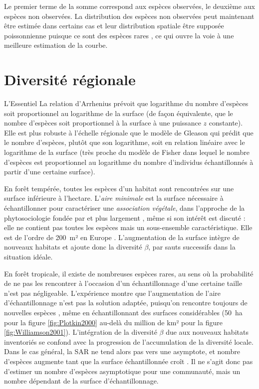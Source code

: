 \documentclass[
  11pt,
  french,
  a4paper,
  extrafontsizes,onecolumn,openright
  ]{memoir}
\newenvironment{Summary}
  {\begin{bclogo}[logo=\bctrombone, noborder=true, couleur=lightgray!50]{L'Essentiel}\parindent0pt}
  {\end{bclogo}}
\newlength{\rf}
\begin{document}
Le premier terme de la somme correspond aux espèces observées, le deuxième aux espèces non observées.
La distribution des espèces non observées peut maintenant être estimée dans certains cas \autocite{Chao2014c} et leur distribution spatiale être supposée poissonnienne puisque ce sont des espèces rares \autocite{Picard2004}, ce qui ouvre la voie à une meilleure estimation de la courbe.

\hypertarget{diversituxe9-ruxe9gionale}{%
\chapter{Diversité régionale}\label{diversituxe9-ruxe9gionale}}

\scriptsize

\begin{Summary}
La relation d'Arrhenius prévoit que logarithme du nombre d'espèces soit
proportionnel au logarithme de la surface (de façon équivalente, que le
nombre d'espèces soit proportionnel à la surface à une puissance \(z\)
constante). Elle est plus robuste à l'échelle régionale que le modèle de
Gleason qui prédit que le nombre d'espèces, plutôt que son logarithme,
soit en relation linéaire avec le logarithme de la surface (très proche
du modèle de Fisher dans lequel le nombre d'espèces est proportionnel au
logarithme du nombre d'individus échantillonnés à partir d'une certaine
surface).
\end{Summary}

\normalsize

En forêt tempérée, toutes les espèces d'un habitat sont rencontrées sur une surface inférieure à l'hectare.
L'\emph{aire minimale} est la surface nécessaire à échantillonner pour caractériser une \emph{association végétale}, dans l'approche de la phytosociologie fondée par \textcite{Braun-Blanquet1928} et plus largement \autocite{Greig-Smith1983}, même si son intérêt est discuté \autocite{McGuinness1984}: elle ne contient pas toutes les espèces mais un sous-ensemble caractéristique.
Elle est de l'ordre de 200~m² en Europe \autocite{Chytry2003}.
L'augmentation de la surface intègre de nouveaux habitats et ajoute donc la diversité \(\beta\), par sauts successifs dans la situation idéale.

En forêt tropicale, il existe de nombreuses espèces rares, au sens où la probabilité de ne pas les rencontrer à l'occasion d'un échantillonnage d'une certaine taille n'est pas négligeable.
L'expérience montre que l'augmentation de l'aire d'échantillonnage n'est pas la solution adaptée, puisqu'on rencontre toujours de nouvelles espèces \autocite{Gotelli2001}, même en échantillonnant des surfaces considérables (50~ha pour la figure \ref{fig:Plotkin2000} au-delà du million de km² pour la figure \ref{fig:Williamson2001}).
L'intégration de la diversité \(\beta\) due aux nouveaux habitats inventoriés se confond avec la progression de l'accumulation de la diversité locale.
Dans le cas général, la SAR ne tend alors pas vers une asymptote, et nombre d'espèces augmente tant que la surface échantillonnée croît \autocite{Williamson2001}.
Il ne s'agit donc pas d'estimer un nombre d'espèces asymptotique pour une communauté, mais un nombre dépendant de la surface d'échantillonnage.
\end{document}
